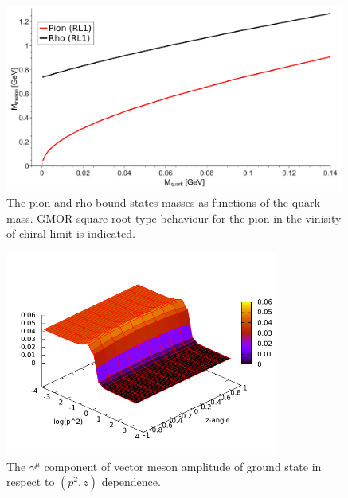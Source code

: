 \begin{figure}[H]
\begin{center}
\includegraphics[width=0.99\textwidth]{figures/GMOR_RL} 
\caption{\footnotesize The pion and rho bound states masses as functions of the quark mass. GMOR square root type behaviour for the pion in the vinisity of chiral limit is indicated. }\label{fig:GMOR_RL}
\end{center}
\end{figure} 
\begin{figure}[!]
\begin{center}
\includegraphics[width=0.80\textwidth]{figures/bsa_vector_ground} 
\caption{\footnotesize The $\gamma^\mu$ component of vector meson \BS amplitude of ground state in respect to $(p^2,z)$ dependence.}\label{fig:bsa_vector_ground}
\end{center}
\end{figure}
